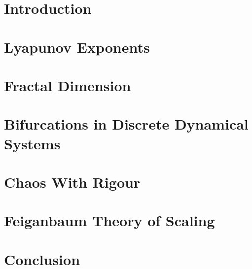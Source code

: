 \documentclass[12pt,oneside]{report}
\begin{document}
\maketitle

\declaration
\dedication{Musa mihi causas memora ...\\
	Muse, tell me the cause ...
}

\tableofcontents

\chapter{Introduction}


\chapter{Lyapunov Exponents}

\chapter{Fractal Dimension}


\chapter{Bifurcations in Discrete Dynamical Systems}\label{chapter:bifurcation}



\chapter{Chaos With Rigour}\label{chapter:chaos_with_rigor}


\chapter{Feiganbaum Theory of Scaling}


\chapter{Conclusion}

\end{document}
